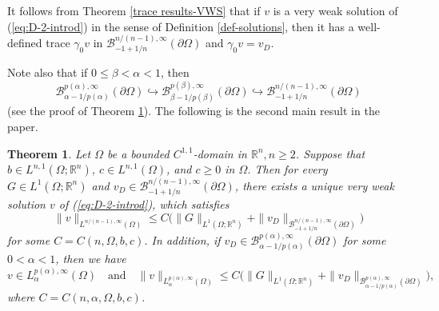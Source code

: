 \documentclass[reqno,centertags,11pt]{amsart}
\newtheorem{thm}{Theorem}
\theoremstyle{definition}
\numberwithin{thm}{section}
\numberwithin{equation}{section}
\newcommand{\R}{{\mathbb{R}}}
\begin{document}
It follows from Theorem \ref{trace results-VWS}   that if $v$ is a very weak solution    of  (\ref{eq:D-2-introd}) in the sense of Definition \ref{def-solutions}, then it has a well-defined  trace $\gamma_0 v $ in $\mathcal{B}_{-1+1/n}^{n/(n-1),\infty}(\partial\Omega )$ and  $\gamma_0 v = v_D$.

Note also  that if $0 \le \beta <  \alpha < 1$, then
$$
 \mathcal{B}_{\alpha -1/p(\alpha )}^{p(\alpha ),\infty}(\partial\Omega )  \hookrightarrow
\mathcal{B}_{\beta -1/p(\beta )}^{p(\beta ),\infty}(\partial\Omega )  \hookrightarrow \mathcal{B}_{-1+1/n}^{n/(n-1),\infty}(\partial\Omega )
$$
(see the proof of Theorem \ref{Poisson-div-L1 data-introd}).  The following is the second main result in the paper.


\begin{thm}\label{Poisson-div-L1 data-introd}
Let $\Omega$ be a bounded $C^{1,1}$-domain in $\R^n , n \ge 2 $.  Suppose that $b \in L^{n,1}(\Omega ; \R^n )$,    $ c \in L^{n,1}(\Omega )$, and $c \ge 0$ in $\Omega$.
Then for every $ G \in L^1  (\Omega ;\R^n )$  and $v_D \in \mathcal{B}_{-1+1/n}^{n/(n-1),\infty}(\partial\Omega ) $, there exists a unique very weak solution  $v  $  of  (\ref{eq:D-2-introd}), which satisfies
\[
 \|   v \|_{L^{n/(n-1),\infty}(\Omega ) }  \le C \Big( \|G \|_{L^1  (\Omega ;\R^n )} + \|v_D \|_{\mathcal{B}_{-1+1/n}^{n/(n-1),\infty}(\partial\Omega )} \Big)
\]
for some  $C=C(n,  \Omega, b,c )$. In addition, if
$v_D \in \mathcal{B}_{\alpha  - 1/p(\alpha)}^{p(\alpha ),\infty}(\partial\Omega )$ for some $0 <\alpha < 1$, then  we have
\[
v \in L_{\alpha}^{p(\alpha) ,\infty}(\Omega ) \quad\mbox{and}\quad
 \|   v \|_{L_{\alpha}^{p(\alpha) ,\infty}(\Omega )  } \le C \Big( \|G \|_{L^1  (\Omega ;\R^n )} + \|v_D \|_{\mathcal{B}_{\alpha  - 1/p(\alpha)}^{p(\alpha ),\infty}(\partial\Omega )} \Big) ,
\]
 where  $C=C(n,\alpha ,   \Omega, b,c )$.
\end{thm}
\end{document}
